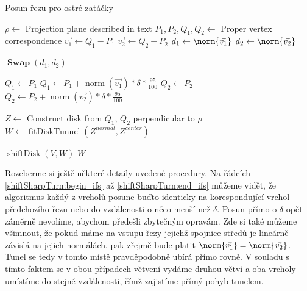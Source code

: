 \begin{algorithm}
\caption{Posun řezu pro ostré zatáčky}
\label{alg:shiftSharpTurn}
\begin{algorithmic}[1]

    \State $ \rho \gets $ Projection plane described in text
    \State $ P_1, P_2, Q_1, Q_2 \gets $ Proper vertex correspondence
    \State $ \vec{v_1} \gets Q_1 - P_1 $
    \State $ \vec{v_2} \gets Q_2 - P_2 $
    \State $ d_1 \gets \norm{\vec{v_1}} $
    \State $ d_2 \gets \norm{\vec{v_2}} $

    \Statex
        \State $ \operatorname{\mathbf{Swap}}(d_1, d_2) $
    \EndIf

    \Statex
     \label{shiftSharpTurn:begin_ifs}
        \State $ Q_1 \gets P_1$
    \Else
        \State $ Q_1 \gets P_1 + \operatorname{norm}(\vec{v_1}) * \delta * \frac{95}{100} $
    \EndIf
        \State $ Q_2 \gets P_2$
    \Else
        \State $ Q_2 \gets P_2 + \operatorname{norm}(\vec{v_2}) * \delta * \frac{95}{100} $ \label{shiftSharpTurn:end_ifs}
    \EndIf

    \Statex
    \State $ Z \gets $ Construct disk from $ Q_1$, $Q_2$ perpendicular to $ \rho $
    \State $ W \gets \operatorname{fitDiskTunnel}(Z^{normal}, Z^{center}) $
    \Statex

        \State \Return $ \operatorname{shiftDisk}(V, W) $ \label{shiftSharpTurn:shift_disk}
    \Else
        \State \Return $ W $
    \EndIf

\EndFunction

\end{algorithmic}
\end{algorithm}

Rozeberme si ještě některé detaily uvedené procedury. Na řádcích
\ref{shiftSharpTurn:begin_ifs} až \ref{shiftSharpTurn:end_ifs} můžeme vidět, že
algoritmus každý z vrcholů posune buďto identicky na korespondující vrchol
předchozího řezu nebo do vzdálenosti o něco menší než $ \delta $. Posun přímo
o $ \delta $ opět záměrně nevolíme, abychom předešli zbytečným opravám. Zde si
také můžeme všimnout, že pokud máme na vstupu řezy jejichž spojnice středů
je lineárně závislá na jejich normálách, pak zřejmě bude platit
$ \norm{\vec{v_1}} = \norm{\vec{v_2}} $. Tunel se tedy v tomto místě
pravděpodobně ubírá přímo rovně. V souladu s tímto faktem se v obou případech
větvení vydáme druhou větví a oba vrcholy umístíme do stejné vzdálenosti, čímž
zajistíme přímý pohyb tunelem.


